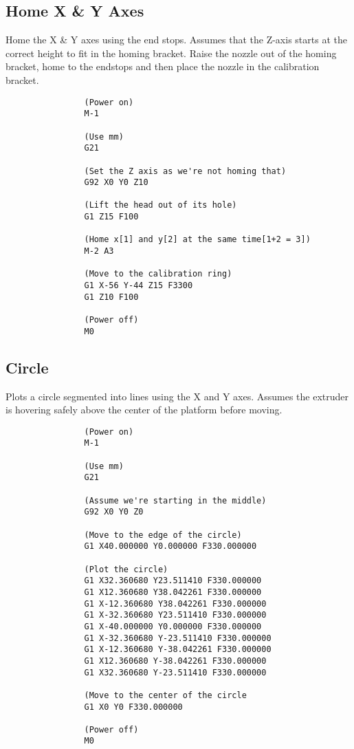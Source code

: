 		\subsection{Home X \& Y Axes}
			
			Home the X \& Y axes using the end stops. Assumes that the Z-axis starts at
			the correct height to fit in the homing bracket. Raise the nozzle out
			of the homing bracket, home to the endstops and then place the nozzle in
			the calibration bracket.
			
			\begin{verbatim}
				(Power on)
				M-1
				
				(Use mm)
				G21
				
				(Set the Z axis as we're not homing that)
				G92 X0 Y0 Z10
				
				(Lift the head out of its hole)
				G1 Z15 F100
				
				(Home x[1] and y[2] at the same time[1+2 = 3])
				M-2 A3
				
				(Move to the calibration ring)
				G1 X-56 Y-44 Z15 F3300
				G1 Z10 F100
				
				(Power off)
				M0
			\end{verbatim}
			
			\label{sec:gcode_home_xy}
		
		\subsection{Circle}
			
			Plots a circle segmented into lines using the X and Y axes. Assumes the
			extruder is hovering safely above the center of the platform before
			moving.
			
			\begin{verbatim}
				(Power on)
				M-1
				
				(Use mm)
				G21
				
				(Assume we're starting in the middle)
				G92 X0 Y0 Z0
				
				(Move to the edge of the circle)
				G1 X40.000000 Y0.000000 F330.000000
				
				(Plot the circle)
				G1 X32.360680 Y23.511410 F330.000000
				G1 X12.360680 Y38.042261 F330.000000
				G1 X-12.360680 Y38.042261 F330.000000
				G1 X-32.360680 Y23.511410 F330.000000
				G1 X-40.000000 Y0.000000 F330.000000
				G1 X-32.360680 Y-23.511410 F330.000000
				G1 X-12.360680 Y-38.042261 F330.000000
				G1 X12.360680 Y-38.042261 F330.000000
				G1 X32.360680 Y-23.511410 F330.000000
				
				(Move to the center of the circle
				G1 X0 Y0 F330.000000
				
				(Power off)
				M0
			\end{verbatim}
